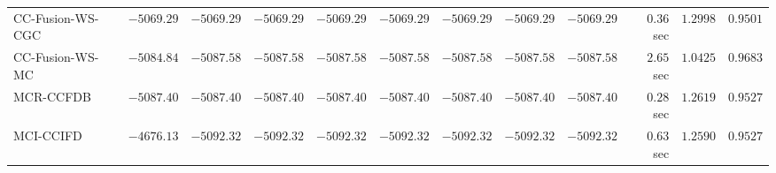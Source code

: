 \begin{table}[H]
\begin{tabular}{lrrrrrrrrrrr}
    CC-Fusion-WS-CGC & $     -5069.29$ & $     -5069.29$ & $     -5069.29$ & $     -5069.29$ & $     -5069.29$ & $     -5069.29$ & $     -5069.29$ & $     -5069.29$ & $         0.36$ sec    & $       1.2998$  & $       0.9501$ \\ 
     CC-Fusion-WS-MC & $     -5084.84$ & $     -5087.58$ & $     -5087.58$ & $     -5087.58$ & $     -5087.58$ & $     -5087.58$ & $     -5087.58$ & $     -5087.58$ & $         2.65$ sec    & $       1.0425$  & $       0.9683$ \\ 
\cmidrule{1-1} 
           MCR-CCFDB & $     -5087.40$ & $     -5087.40$ & $     -5087.40$ & $     -5087.40$ & $     -5087.40$ & $     -5087.40$ & $     -5087.40$ & $     -5087.40$ & $         0.28$ sec    & $       1.2619$  & $       0.9527$ \\ 
\cmidrule{1-1} 
           MCI-CCIFD & $     -4676.13$ & $     -5092.32$ & $     -5092.32$ & $     -5092.32$ & $     -5092.32$ & $     -5092.32$ & $     -5092.32$ & $     -5092.32$ & $         0.63$ sec    & $       1.2590$  & $       0.9527$ \\ 
\bottomrule
\end{tabular}
\end{table}

